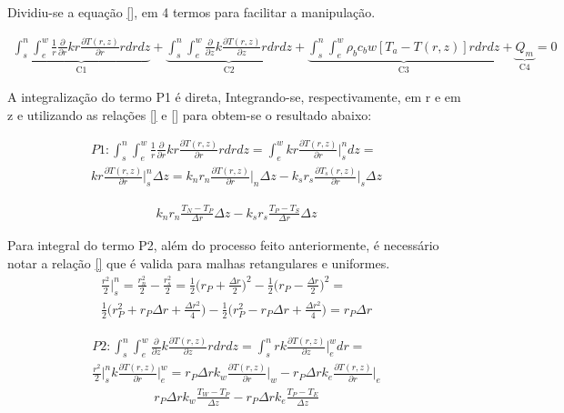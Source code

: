 \documentclass[
	12pt,				%
	openright,			%
	oneside,			%
	a4paper,			%
	english,			%
	french,				%
	spanish,			%
	brazil				%
	]{abntex2}
\begin{document}
Dividiu-se a equação \ref{}, em 4 termos para facilitar a manipulação. 






\begin{gather}
\underbrace{\int_{s}^{n} \int_{e}^{w} \frac{1}{r}\frac{\partial}{\partial r}k r \frac{\partial T(r,z)}{\partial r}rdrdz}_\text{C1}    +\underbrace{\int_{s}^{n} \int_{e}^{w} \frac{\partial}{\partial z}k\frac{\partial T(r,z)}{\partial z} rdrdz}_\text{C2}    +\underbrace{\int_{s}^{n} \int_{e}^{w} \rho_b c_b w [T_a-T(r,z)]rdrdz}_\text{C3}+\underbrace{Q_m}_\text{C4}  =0
\end{gather}


A integralização do termo P1 é direta, Integrando-se, respectivamente, em r e em z e utilizando as relações \ref{} e \ref{} para obtem-se o resultado abaixo:

\begin{gather}
P1:\int_{s}^{n} \int_{e}^{w} \frac{1}{r}\frac{\partial}{\partial r}k r \frac{\partial T(r,z)}{\partial r}rdrdz=\int_{e}^{w} k r \frac{\partial T(r,z)}{\partial r} \biggr\rvert^{n}_{s} dz= 
\\
k r \frac{\partial T(r,z)}{\partial r} \biggr\rvert^{n}_{s} \Delta z= 
k_n r_n \frac{\partial T(r,z)}{\partial r}\biggr\rvert_{n}\Delta z-k_s r_s \frac{\partial T_s(r,z)}{\partial r}\biggr\rvert_{s}\Delta z
\end{gather} 

\begin{gather}
k_n r_n \frac{T_N-T_P}{\Delta r}\Delta z-k_s r_s  \frac{T_P-T_S}{\Delta r}\Delta z 
\end{gather} 

Para integral do termo P2, além do processo feito anteriormente, é necessário notar a relação \ref{} que é valida para malhas retangulares e uniformes.
\begin{gather}                                           
\frac{r^2}{2}\biggr\rvert^{n}_{s}=\frac{r_{n}^2}{2}-\frac{r_{s}^2}{2}=\frac{1}{2}\biggr(r_P+\frac{\Delta r}{2}\biggr)^2-\frac{1}{2}\biggr(r_P-\frac{\Delta r}{2}\biggr)^2=
\\
\frac{1}{2}\biggr(r_P^2+r_P\Delta r+\frac{\Delta r ^2}{4}\biggr)-\frac{1}{2}\biggr(r_P^2-r_P\Delta r+\frac{\Delta r ^2}{4}\biggr)=
r_P\Delta r
\end{gather}  

\begin{gather}                                           
P2:\int_{s}^{n} \int_{e}^{w}\frac{\partial}{\partial z}k \frac{\partial T(r,z)}{\partial z}rdrdz=\int_{s}^{n} r k \frac{\partial T(r,z)}{\partial z} \biggr\rvert^{w}_{e} dr=
\\
 \frac{r^2}{2}\biggr\rvert^{n}_{s} k \frac{\partial T(r,z)}{\partial r} \biggr\rvert^{w}_{e}=
r_P \Delta r k_w \frac{\partial T(r,z)}{\partial r} \biggr\rvert_{w} -r_P \Delta r k_e \frac{\partial T(r,z)}{\partial r} \biggr\rvert_{e}
\end{gather}
\begin{gather}
r_P \Delta r k_w \frac{T_W-T_P}{\Delta z} -r_P \Delta r k_e \frac{T_P-T_E}{\Delta z}
\end{gather}   
   
\end{document}
